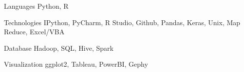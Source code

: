 

\begin{cvskills}

  \cvskill
    {Languages} %
    {Python, R} %

  \cvskill
    {Technologies} %
    {IPython, PyCharm, R Studio, Github, Pandas, Keras, Unix, Map Reduce, Excel/VBA} %

  \cvskill
    {Database} %
    {Hadoop, SQL, Hive, Spark} %
    
  \cvskill
    {Visualization} %
    {ggplot2, Tableau, PowerBI, Gephy}
    
\end{cvskills}
